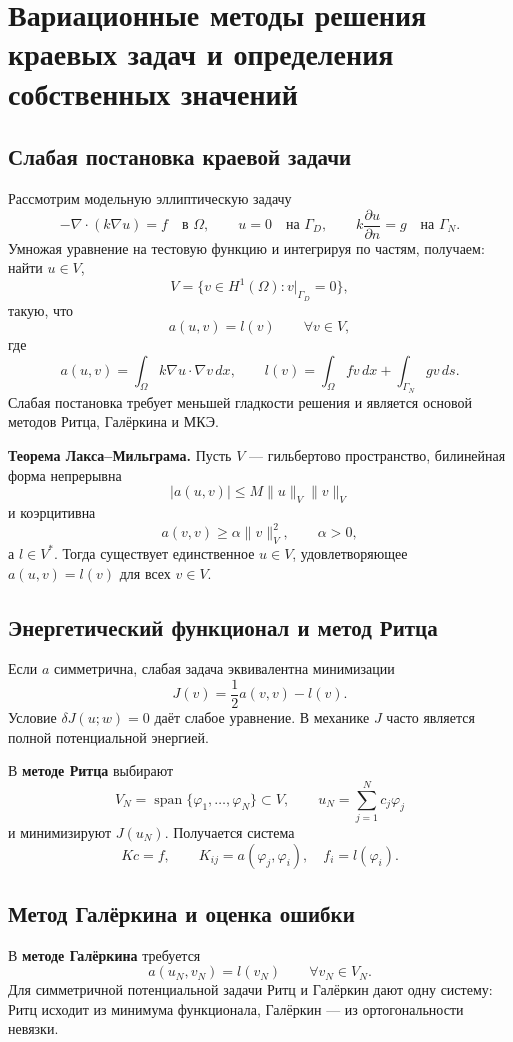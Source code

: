 \section{Вариационные методы решения краевых задач и определения собственных значений}
\label{sec:variational-bvp-eigen}

\subsection{Слабая постановка краевой задачи}

Рассмотрим модельную эллиптическую задачу
\[
-\nabla\cdot(k\nabla u)=f\quad\text{в }\Omega,
\qquad
u=0\quad\text{на }\Gamma_D,
\qquad
k\frac{\partial u}{\partial n}=g\quad\text{на }\Gamma_N.
\]
Умножая уравнение на тестовую функцию и интегрируя по частям, получаем: найти $u\in V$,
\[
V=\{v\in H^1(\Omega):v|_{\Gamma_D}=0\},
\]
такую, что
\[
\boxed{a(u,v)=l(v)\qquad\forall v\in V},
\]
где
\[
a(u,v)=\int_\Omega k\nabla u\cdot\nabla v\,dx,
\qquad
l(v)=\int_\Omega fv\,dx+\int_{\Gamma_N}gv\,ds.
\]
Слабая постановка требует меньшей гладкости решения и является основой методов Ритца, Галёркина и МКЭ.

\textbf{Теорема Лакса--Мильграма.} Пусть $V$ --- гильбертово пространство, билинейная форма непрерывна
\[
|a(u,v)|\le M\|u\|_V\|v\|_V
\]
и коэрцитивна
\[
a(v,v)\ge\alpha\|v\|_V^2,
\qquad \alpha>0,
\]
а $l\in V^*$. Тогда существует единственное $u\in V$, удовлетворяющее $a(u,v)=l(v)$ для всех $v\in V$.

\subsection{Энергетический функционал и метод Ритца}

Если $a$ симметрична, слабая задача эквивалентна минимизации
\[
J(v)=\frac12a(v,v)-l(v).
\]
Условие $\delta J(u;w)=0$ даёт слабое уравнение. В механике $J$ часто является полной потенциальной энергией.

В \textbf{методе Ритца} выбирают
\[
V_N=\operatorname{span}\{\varphi_1,\ldots,\varphi_N\}\subset V,
\qquad
u_N=\sum_{j=1}^{N}c_j\varphi_j
\]
и минимизируют $J(u_N)$. Получается система
\[
Kc=f,
\qquad
K_{ij}=a(\varphi_j,\varphi_i),
\quad
f_i=l(\varphi_i).
\]

\subsection{Метод Галёркина и оценка ошибки}

В \textbf{методе Галёркина} требуется
\[
a(u_N,v_N)=l(v_N)
\qquad \forall v_N\in V_N.
\]
Для симметричной потенциальной задачи Ритц и Галёркин дают одну систему: Ритц исходит из минимума функционала, Галёркин --- из ортогональности невязки.

